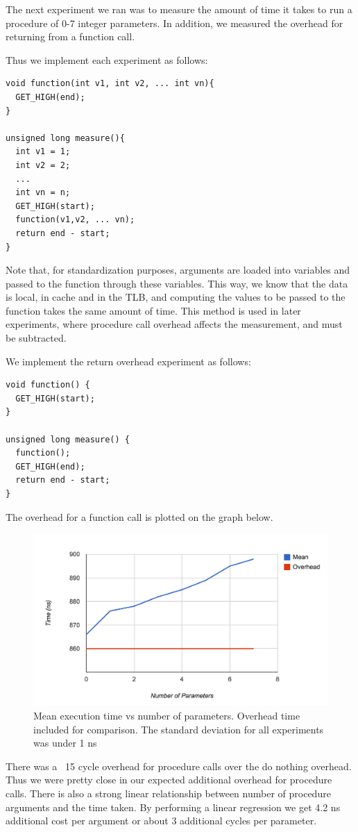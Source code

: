 The next experiment we ran was to measure the amount of time it takes to run a procedure of 0-7 integer parameters. In addition, we measured the overhead for returning from a function call. 

Thus we implement each experiment as follows: 
\begin{verbatim}
void function(int v1, int v2, ... int vn){
  GET_HIGH(end);
}

unsigned long measure(){
  int v1 = 1;
  int v2 = 2;
  ...
  int vn = n;
  GET_HIGH(start);
  function(v1,v2, ... vn);
  return end - start;
}
\end{verbatim}

Note that, for standardization purposes, arguments are loaded into variables and passed to the function through these variables. This way, we know that the data is local, in cache and in the TLB, and computing the values to be passed to the function takes the same amount of time. This method is used in later experiments, where procedure call overhead affects the measurement, and must be subtracted.

We implement the return overhead experiment as follows:
\begin{verbatim}
void function() {
  GET_HIGH(start);
}

unsigned long measure() {
  function();
  GET_HIGH(end);
  return end - start;
}
\end{verbatim}

The overhead for a function call is plotted on the graph below.

\begin{figure}[h]
\centering
\includegraphics[scale=.5]{experiments/exp_1_2_fig.png}
\caption{Mean execution time vs number of parameters.  Overhead time included for comparison.  The standard deviation for all experiments was under 1 ns}
\end{figure}

There was a ~15 cycle overhead for procedure calls over the do nothing overhead.  Thus we were pretty close in our expected additional overhead for procedure calls.  There is also a strong linear relationship between number of procedure arguments and the time taken.  By performing a linear regression we get 4.2 ns additional cost per argument or about 3  additional cycles per parameter.
